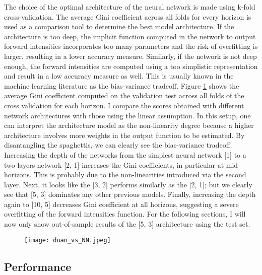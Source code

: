 The choice of the optimal architecture of the neural network is made using k-fold cross-validation. The average Gini coefficient across all folds for every horizon is used as a comparison tool to determine the best model architecture. If the architecture is too deep, the implicit function computed in the network to output forward intensities incorporates too many parameters and the risk of overfitting is larger, resulting in a lower accuracy measure. Similarly, if the network is not deep enough, the forward intensities are computed using a too simplistic representation and result in a low accuracy measure as well. This is usually known in the machine learning literature as the bias-variance tradeoff. Figure \ref{fig:ginicomp} shows the average Gini coefficient computed on the validation test across all folds of the cross validation for each horizon. I compare the scores obtained with different network architectures with those using the linear assumption. In this setup, one can interpret the architecture model as the non-linearity degree because a higher architecture involves more weights in the output function to be estimated. By disantangling the spaghettis, we can clearly see the bias-variance tradeoff. Increasing the depth of the networks from the simplest neural network [1] to a two layers network [2, 1] increases the Gini coefficients, in particular at mid horizons. This is probably due to the non-linearities introduced via the second layer. Next, it looks like the [3, 2] performs similarly as the [2, 1]; but we clearly see that [5, 3] dominates any other previous models. Finally, increasing the depth again to [10, 5] decreases Gini coefficient at all horizons, suggesting a severe overfitting of the forward intensities function. For the following sections, I will now only show out-of-sample results of the [5, 3] architecture using the test set. 

\begin{figure}
    \centering
    \texttt{[image: duan\_vs\_NN.jpeg]}
    \label{fig:ginicomp}
\end{figure}

\subsection{Performance}
\label{sec4-2}

